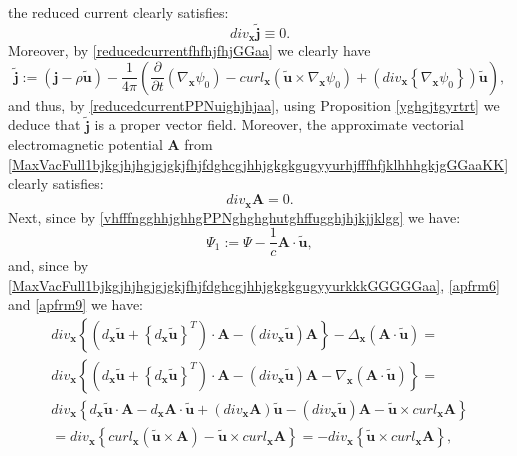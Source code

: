 \documentclass{article}
\theoremstyle{definition}
\theoremstyle{remark}
\renewcommand{\vec}[1]{\mathbf{#1}}
\newcommand{\er}{\eqref}
\newcommand{\er}{\eqref}
\begin{document}
the reduced current clearly satisfies:
\begin{equation}\label{divreducedcurrentPPNaa}
div_{\vec x}\vec {\widetilde j}\equiv 0.
\end{equation}
Moreover,  by \er{reducedcurrentfhfhjfhjGGaa} we clearly have
\begin{equation}\label{reducedcurrentPPNuighjhjaa}
\vec {\widetilde j}:=(\vec j-\rho\vec {\tilde
u})-\frac{1}{4\pi}\left(\frac{\partial}{\partial t}
\left(\nabla_{\vec x}\psi_0\right)-curl_{\vec x}\left(\vec {\tilde
u}\times \nabla_{\vec x}\psi_0\right)+\left(div_{\vec
x}\left\{\nabla_{\vec x}\psi_0\right\}\right)\vec {\tilde u}\right),
\end{equation}
and thus, by \er{reducedcurrentPPNuighjhjaa}, using Proposition
\ref{yghgjtgyrtrt}
we deduce that $\vec {\widetilde j}$ is a proper vector field.
Moreover, the approximate vectorial electromagnetic potential $\vec
A$ from
\er{MaxVacFull1bjkgjhjhgjgjgkjfhjfdghcgjhhjgkgkgugyyurhjfffhfjklhhhgkjgGGaaKK}
clearly satisfies:
\begin{equation}\label{MaxVacFull1bjkgjhjhgjgjgkjfhjfdghcgjhhjgkgkgugyyurkkkGGGGGaa}
div_{\vec x}\vec A=0.
\end{equation}
Next, since by \er{vhfffngghhjghhgPPNghghghutghffugghjhjkjjklgg} we
have:
\begin{equation}\label{vhfffngghhjghhgPPNghghghutghffugghjhjkjjklgghkhhh}
\Psi_1:=\Psi-\frac{1}{c}\vec A\cdot\vec {\tilde u},
\end{equation}
and, since by
\er{MaxVacFull1bjkgjhjhgjgjgkjfhjfdghcgjhhjgkgkgugyyurkkkGGGGGaa},
\er{apfrm6} and \er{apfrm9} we have:
\begin{multline}\label{MaxVacFullPPNnnnffffffyuughjhjhjhhjjkjhkkjhhjhghGGGGaajjkkjkjlj}
div_{\vec x} \left\{\left(d_{\vec x}\vec {\tilde u}+\left\{d_{\vec
x}\vec {\tilde u}\right\}^T\right)\cdot\vec A-\left(div_{\vec x}\vec
{\tilde u}\right)\vec A\right\}-\Delta_{\vec x}\left(\vec A\cdot\vec
{\tilde u}\right)=\\div_{\vec x} \left\{\left(d_{\vec x}\vec {\tilde
u}+\left\{d_{\vec x}\vec {\tilde u}\right\}^T\right)\cdot\vec
A-\left(div_{\vec x}\vec {\tilde u}\right)\vec A-\nabla_{\vec
x}\left(\vec A\cdot\vec {\tilde u}\right)\right\}=\\ div_{\vec x}
\left\{d_{\vec x}\vec {\tilde u}\cdot\vec A-d_{\vec x}\vec
A\cdot\vec {\tilde u}+\left(div_{\vec x}\vec A\right)\vec {\tilde
u}-\left(div_{\vec x}\vec {\tilde u}\right)\vec A-\vec {\tilde
u}\times curl_{\vec x}\vec A\right\}\\= div_{\vec x}
\left\{curl_{\vec x}\left(\vec {\tilde u}\times\vec A\right)-\vec
{\tilde u}\times curl_{\vec x}\vec A\right\}= -div_{\vec x}
\left\{\vec {\tilde u}\times curl_{\vec x}\vec A\right\},
\end{multline}
\end{document}

